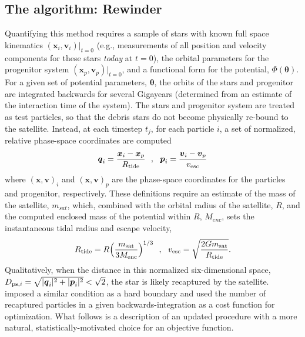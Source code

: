 \documentclass{emulateapj}
\newcommand{\bs}{\boldsymbol}
\begin{document}
\subsection{The algorithm: Rewinder}
Quantifying this method requires a sample of stars with known full
space kinematics $(\bs{x}_{i}, \bs{v}_{i})|_{t=0}$ (e.g., measurements
of all position and velocity components for these stars \emph{today}
at $t=0$), the orbital parameters for the progenitor system
$(\bs{x}_p, \bs{v}_p)|_{t=0}$, and a functional form for the
potential, $\Phi({\boldsymbol\theta})$. For a given set of potential
parameters, $\boldsymbol\theta$, the orbits of the stars and
progenitor are integrated backwards for several Gigayears (determined
from an estimate of the interaction time of the system). The stars and
progenitor system are treated as test particles, so that the debris
stars do not become physically re-bound to the satellite. Instead, at
each timestep $t_j$, for each particle $i$, a set of normalized,
relative phase-space coordinates are computed
\begin{equation}
  \bs{q}_{i} = \frac{\bs{x}_{i} -
    \bs{x}_{p}}{R_{\rm tide}}\,\,\,\,,\,\,\,\,\bs{p}_{i} = \frac{\bs{v}_{i} -
    \bs{v}_{p}}{v_{\rm esc}}
\end{equation}
where $(\bs{x},\bs{v})_{i}$ and $(\bs{x},\bs{v})_{p}$ are the
phase-space coordinates for the particles and progenitor,
respectively. These definitions require an estimate of the mass of the
satellite, $m_{sat}$, which, combined with the orbital radius of the
satellite, $R$, and the computed enclosed mass of the potential within
$R$, $M_{enc}$, sets the instantaneous tidal radius and escape
velocity,
\begin{equation}
  R_{\rm tide}=R\Big(\frac{m_{\rm sat}}{3M_{\rm enc}}\Big)^{1/3}\,\,\,\,,\,\,\,\,
  v_{\rm esc}=\sqrt{\frac{2Gm_{\rm sat}}{R_{\rm tide}}}.
\end{equation}
Qualitatively, when the distance in this normalized six-dimensional
space, $D_{{\rm ps},i}=\sqrt{|\bs{q}_{i}|^2+|\bs{p}_{i}|^2} <
\sqrt{2}$, the star is likely recaptured by the
satellite. \citet{johnston99a} imposed a similar
condition as a hard boundary and used the number of recaptured
particles in a given backwards-integration as a cost function for
optimization. What follows is a description of an updated procedure
with a more natural, statistically-motivated choice for an objective
function.

\end{document}
